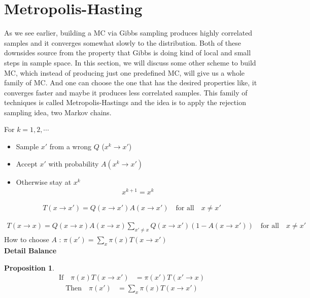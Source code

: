 \documentclass[11pt, oneside, reqno]{amsart}
\numberwithin{equation}{section}
\theoremstyle{plain}%
\newtheorem{prop}[thm]{Proposition}
\theoremstyle{definition}
\theoremstyle{remark}
\begin{document}
\section{Metropolis-Hasting}
As we see earlier, building a MC via Gibbs sampling produces highly correlated samples and it converges somewhat slowly to the distribution. Both of these downsides source from the property that Gibbs is doing kind of local and small steps in sample space. In this section, we will discuss some other scheme to build MC, which instead of producing just one predefined MC, will give us a whole family of MC. And one can choose the one that has the desired properties like, it converges faster and maybe it produces less correlated samples. This family of techniques is called Metropolis-Hastings and the idea is to apply the rejection sampling idea, two Markov chains. 
\\

\begin{mdframed}
	For $k=1,2,\cdots$
	\begin{itemize}
		\item Sample $x'$ from a {\color{red} wrong} $Q$ ($x^k\to x'$)
		\item Accept $x'$ with probability $A(x^k\to x')$
		\item Otherwise stay at $x^k$
		\begin{align*}
			x^{k+1}=x^k
		\end{align*}
	\end{itemize}
\end{mdframed}

\begin{align*}
	T(x\to x')=Q(x\to x')A(x\to x')\quad\text{for all}\quad x\neq x'
\end{align*}

\begin{align*}
	T(x\to x)=Q(x\to x)A(x\to x)\sum_{x'\neq x}Q(x\to x')(1-A(x\to x'))\quad\text{for all}\quad x\neq x'
\end{align*}
How to choose $A$ : $\pi(x')=\sum_x\pi(x)T(x\to x')$
\\

\textbf{Detail Balance}
\begin{prop}
	\begin{align*}
	\text{If}\quad\pi(x)T(x\to x')&= \pi(x')T(x'\to x)
	\end{align*}
	\begin{align*}
	\text{Then}\quad\pi(x')&=\sum_x \pi(x)T(x\to x')
	\end{align*}
\end{prop}
\end{document}
